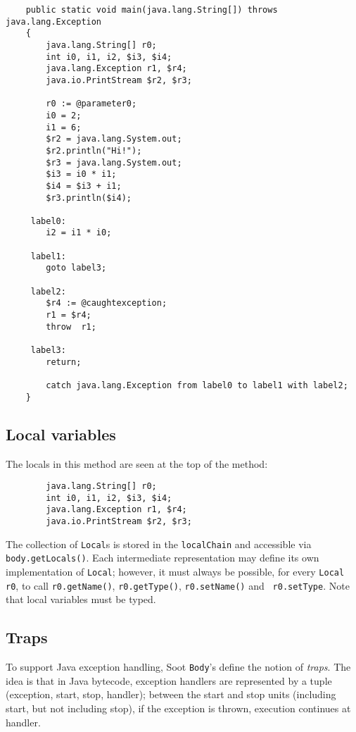 \documentclass{article}
\begin{document}
\begin{verbatim}
    public static void main(java.lang.String[]) throws java.lang.Exception 
    {
        java.lang.String[] r0;
        int i0, i1, i2, $i3, $i4;
        java.lang.Exception r1, $r4;
        java.io.PrintStream $r2, $r3;

        r0 := @parameter0;
        i0 = 2;
        i1 = 6;
        $r2 = java.lang.System.out;
        $r2.println("Hi!");
        $r3 = java.lang.System.out;
        $i3 = i0 * i1;
        $i4 = $i3 + i1;
        $r3.println($i4);

     label0:
        i2 = i1 * i0;

     label1:
        goto label3;

     label2:
        $r4 := @caughtexception;
        r1 = $r4;
        throw  r1;

     label3:
        return;

        catch java.lang.Exception from label0 to label1 with label2;
    }
\end{verbatim}

\subsection{Local variables}

The locals in this method are seen at the top of the method:
\begin{verbatim}
        java.lang.String[] r0;
        int i0, i1, i2, $i3, $i4;
        java.lang.Exception r1, $r4;
        java.io.PrintStream $r2, $r3;
\end{verbatim}

The collection of {\tt Local}s is stored in the {\tt localChain} and
accessible via {\tt body.getLocals()}.  Each intermediate
representation may define its own implementation of {\tt Local};
however, it must always be possible, for every {\tt Local r0}, to call
{\tt r0.getName()}, {\tt r0.getType()}, {\tt r0.setName()} and {\tt
r0.setType}.  Note that local variables must be typed.

\subsection{Traps}

To support Java exception handling, Soot {\tt Body}'s define the notion
of {\em traps}.  The idea is that in Java bytecode, exception handlers are
represented by a tuple (exception, start, stop, handler); between the start
and stop units (including start, but not including stop), if the exception is 
thrown, execution continues at handler.
\end{document}
